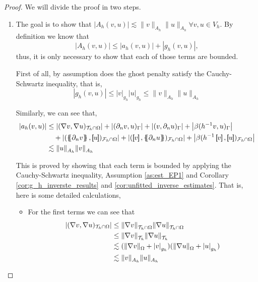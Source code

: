 \begin{proof}
    We will divide the proof in two steps.

    \begin{enumerate}[label=\arabic*)]
        \item
The goal is to show that $\left\lvert A_{h}( v,u) \right\rvert \lesssim \| v \|_{A_{h}  }^{  }     \| u \|_{A_{h}  }^{  }  \forall v,u \in V_{h} $.
            By definition we know that \[
    \left\lvert A_{h}( v,u) \right\rvert \le  \left\lvert a_{h}( v,u)  \right\rvert  + \left\lvert g_{h}( v,u)  \right\rvert,
    \]
    thus, it is only necessary to show that each of those terms are bounded.

         First of all, by assumption does the ghost penalty satisfy the Cauchy-Schwartz inequality, that is,  \[
\left\lvert g_{h}( v,u)  \right\rvert \le \left\lvert v \right\rvert _{g_{h}} \left\lvert u \right\rvert _{g_{h}} \le \| v \|_{ A_{h} }^{  } \| u \|_{ A_{h} }^{  }
    \]

    Similarly, we can see that,      \[
        \begin{split}
    \left\lvert a_{h}( v,u)  \right\rvert & \le  \left\lvert( \nabla v, \nabla u)_{\mathcal{T} _{h} \cap \Omega }  \right\rvert +  \left\lvert  ( \partial _{n} v,u)_{\Gamma } \right\rvert   + \left\lvert ( v, \partial _{n} u)_{\Gamma } \right\rvert  +
    \left\lvert\beta ( h^{-1} v,u)_{\Gamma }  \right\rvert  \\
    & \quad  + \left\lvert( \mean{ \partial _{n} v }  , \jump{ u }  ) _{\mathcal{F} _{h} \cap \Omega }  \right\rvert  + \left\lvert ( \jump{ v }  , \mean{ \partial _{n} u }  )_{\mathcal{F} _{h}\cap \Omega } \right\rvert  + \left\lvert \beta ( h^{-1} \jump{ v }  ,
    \jump{ u }  )_{\mathcal{F}_{h}\cap \Omega  } \right\rvert \\
     & \lesssim  \| u \|_{ A_{h} }^{  } \| v \|_{ A_{h} }^{  }
        \end{split}
    \]

This is proved by showing that each term is bounded by applying the Cauchy-Schwartz inequality, Assumption \ref{as:est_EP1} and Corollary \ref{cor:g_h_inverste_results} and \ref{cor:unfitted_inverse_estimates}. That is, here is some
    detailed calculations,
    \begin{itemize}
        \item For the first terms we can see that \[
\begin{split}
\left\lvert( \nabla v, \nabla u)_{\mathcal{T} _{h} \cap \Omega }  \right\rvert & \le \| \nabla v \|_{ \mathcal{T} _{h}\cap \Omega  }^{  }\| \nabla u \|_{ \mathcal{T} _{h} \cap \Omega  }^{  } \\
& \le \| \nabla v \|_{ \mathcal{T} _{h}  }^{  }\| \nabla u \|_{ \mathcal{T} _{h}   }^{  } \\
        & \lesssim   ( \| \nabla v \|_{ \Omega  }^{  } + \left\lvert  v  \right\rvert _{g_{h}} )( \| \nabla u \|_{ \Omega  }^{  } + \left\lvert  u  \right\rvert _{g_{h}} )\\
        &  \lesssim  \| v \|_{ A_{h} }^{  } \|u  \|_{ A_{h} }^{  }
\end{split}
            \]


\end{itemize}
\end{enumerate}
\end{proof}
